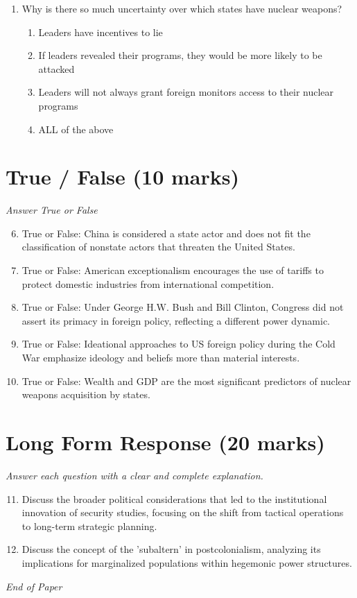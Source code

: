 \documentclass[12pt]{article}
\begin{document}
\begin{enumerate}[label=\arabic*.]
\begin{enumerate}[label=(\alph*)]
    \item the United Nations.
    \item the National Security Council.
    \item the State Department.
    \item the National Security Agency.
\end{enumerate}
\item Why is there so much uncertainty over which states have nuclear weapons?
\begin{enumerate}[label=(\alph*)]
    \item Leaders have incentives to lie
    \item If leaders revealed their programs, they would be more likely to be attacked
    \item Leaders will not always grant foreign monitors access to their nuclear programs
    \item ALL of the above
\end{enumerate}
\end{enumerate}

\section*{True / False (10 marks)}
\textit{Answer True or False}
\begin{enumerate}[label=\arabic*.]
\setcounter{enumi}{5}
\item True or False: China is considered a state actor and does not fit the classification of nonstate actors that threaten the United States.
\item True or False: American exceptionalism encourages the use of tariffs to protect domestic industries from international competition.
\item True or False: Under George H.W. Bush and Bill Clinton, Congress did not assert its primacy in foreign policy, reflecting a different power dynamic.
\item True or False: Ideational approaches to US foreign policy during the Cold War emphasize ideology and beliefs more than material interests.
\item True or False: Wealth and GDP are the most significant predictors of nuclear weapons acquisition by states.
\end{enumerate}

\section*{Long Form Response (20 marks)}
\textit{Answer each question with a clear and complete explanation.}
\begin{enumerate}[label=\arabic*.]
\setcounter{enumi}{10}
\item Discuss the broader political considerations that led to the institutional innovation of security studies, focusing on the shift from tactical operations to long-term strategic planning.
\item Discuss the concept of the 'subaltern' in postcolonialism, analyzing its implications for marginalized populations within hegemonic power structures.
\end{enumerate}

\vfill
\noindent\textit{End of Paper}
\end{document}
